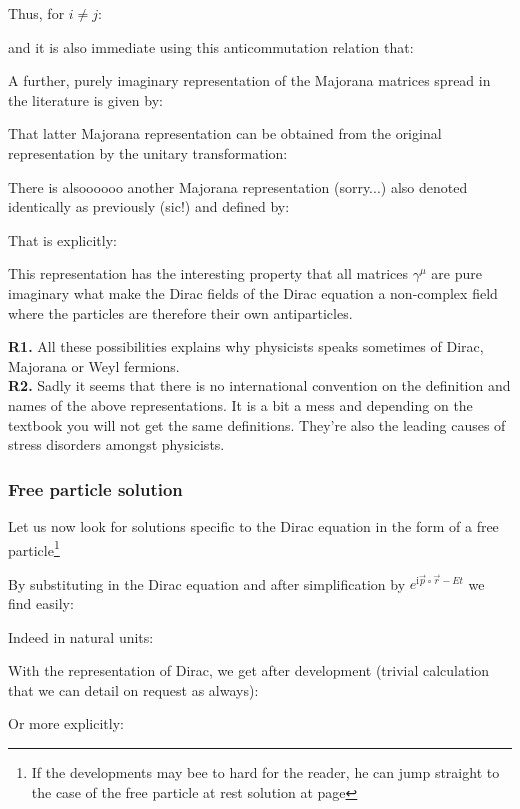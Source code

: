 	Thus, for $i\neq j$:
	
	and it is also immediate using this anticommutation relation that:
	
	A further, purely imaginary representation of the Majorana matrices spread in the literature is given by:
	
	That latter Majorana representation can be obtained from the original representation by the unitary transformation:
	
	There is alsoooooo another Majorana representation (sorry...) also denoted identically as previously (sic!) and defined by:
	
	That is explicitly:
	
	This representation has the interesting property that all matrices $\gamma^\mu$ are pure imaginary what make the Dirac fields of the Dirac equation a non-complex field where the particles are therefore their own antiparticles.
	\begin{tcolorbox}[title=Remarks,colframe=black,arc=10pt]
	\textbf{R1.} All these possibilities explains why physicists speaks sometimes of Dirac, Majorana or Weyl fermions.\\
	
	\textbf{R2.} Sadly it seems that there is no international convention on the definition and names of the above representations. It is a bit a mess and depending on the textbook you will not get the same definitions. They're also the leading causes of stress disorders amongst physicists.
	\end{tcolorbox}
	
	\subsubsection{Free particle solution}
	Let us now look for solutions specific to the Dirac equation in the form of a free particle\footnote{If the developments may bee to hard for the reader, he can jump straight to the case of the free particle at rest solution at page \pageref{free particle solution at rest}}
	
	By substituting in the Dirac equation and after simplification by $e^{\mathrm{i}\vec{p}\circ\vec{r}-Et}$ we find easily:
	
	Indeed in natural units:
	
	With the representation of Dirac, we get after development (trivial calculation that we can detail on request as always):
	
	Or more explicitly:
	

